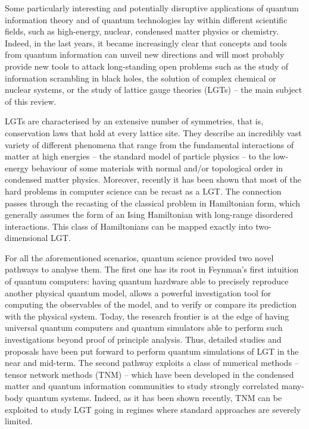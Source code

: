 \documentclass[epj,final]{svjour}
\begin{document}
Some particularly interesting and potentially disruptive applications of quantum information theory and of quantum technologies lay within different scientific fields, such as high-energy, nuclear, condensed matter physics or chemistry\cite{trabesinger2012quantum}. Indeed, in the last years, it became increasingly clear that concepts and tools from quantum information can unveil new directions and will most probably provide new tools to attack long-standing open problems such as the study of information scrambling in black holes\cite{susskind2016computational}, the solution of complex chemical or nuclear systems\cite{PhysRevLett.120.210501}, or the study of lattice gauge theories (LGTs) -- the main subject of this review.  

LGTs are characterised by an extensive number of symmetries, that is, conservation laws that hold at every lattice site. They describe an incredibly vast variety of different phenomena that range from the fundamental interactions of matter at high energies \cite{kronfeld2012twenty} -- the standard model of particle physics -- to the low-energy behaviour of some materials with normal and/or topological order in condensed matter physics\cite{altland2010condensed,fradkin2013field}. Moreover, recently it has been shown that most of the hard problems in computer science can be recast as a LGT\cite{de2009unifying,10.3389/fphy.2014.00005}. The connection passes through the recasting of the classical problem in Hamiltonian form, which generally assumes the form of an Ising Hamiltonian with long-range disordered interactions. This class of Hamiltonians can be mapped exactly into two-dimensional LGT\cite{Lechnere1500838}. 

For all the aforementioned scenarios, quantum science provided two novel pathways to analyse them. The first one has its root in Feynman's first intuition \cite{feynman1982simulating} of quantum computers: having quantum hardware able to precisely reproduce another physical quantum model, allows a powerful investigation tool for computing the observables of the model, and to verify or compare its prediction with the physical system. Today, the research frontier is at the edge of having universal quantum computers and quantum simulators able to perform such investigations beyond proof of principle analysis. Thus, detailed studies and proposals have been put forward to perform quantum simulations of LGT in the near and mid-term\cite{preskill2018quantum}. The second pathway exploits a class of numerical methods -- tensor network methods (TNM) -- which have been developed in the condensed matter and quantum information communities to study strongly correlated many-body quantum systems\cite{RevModPhys.77.259}. Indeed, as it has been shown recently, TNM can be exploited to study LGT going in regimes where standard approaches are severely limited\cite{Dalmonte2016,banuls2019review}. 
\end{document}
